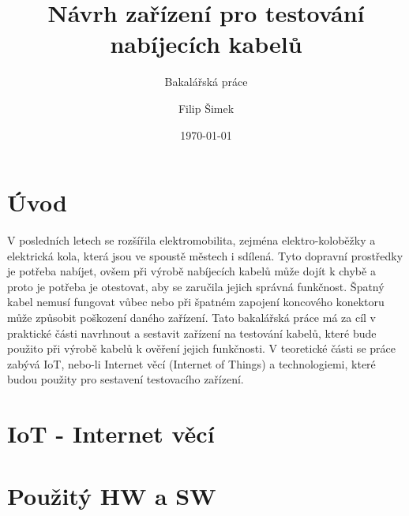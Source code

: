 \documentclass[12pt,a4paper,titlepage]{scrreprt}
\title{\vspace{6cm}Návrh zařízení pro testování nabíjecích kabelů}
\subtitle{Bakalářská práce}
\author{Filip Šimek}
\date{\today}
\makeatletter
\newcommand\thefontsize{(Font size = \f@size pt)}
\makeatother
\begin{document}
	
	
	
	\thispagestyle{empty}
	
	\thispagestyle{empty}
	
	\setcounter{page}{5}
	\newpage
	\thispagestyle{empty}
	
	
	\tableofcontents
	\thispagestyle{empty}
	
	\listoffigures
	\thispagestyle{empty}
	\listoftables
	\thispagestyle{empty}
	
	\chapter{Úvod} %
	V posledních letech se rozšířila elektromobilita, zejména elektro-koloběžky a elektrická kola, která jsou ve spoustě městech i sdílená. Tyto dopravní prostředky je potřeba nabíjet, ovšem při výrobě nabíjecích kabelů může dojít k chybě a proto je potřeba je otestovat, aby se zaručila jejich správná funkčnost. Špatný kabel nemusí fungovat vůbec nebo při špatném zapojení koncového konektoru může způsobit poškození daného zařízení. Tato bakalářská práce má za cíl v praktické části navrhnout a sestavit zařízení na testování kabelů, které bude použito při výrobě kabelů k ověření jejich funkčnosti. V teoretické části se práce zabývá IoT, nebo-li Internet věcí (Internet of Things) a technologiemi, které budou použity pro sestavení testovacího zařízení.
	
	\chapter{IoT - Internet věcí}
	
	
	
	
	\chapter{Použitý HW a SW}
	
	\newpage
	
	\newpage
	
	
\end{document}
